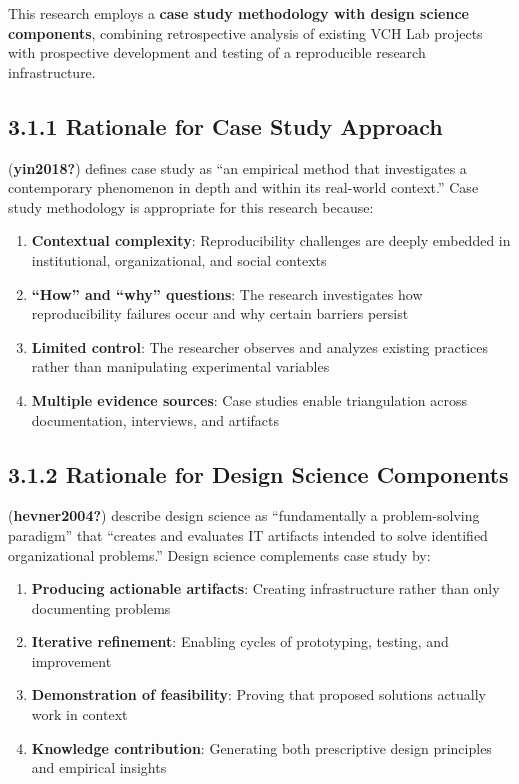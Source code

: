 \documentclass[
  oneside,
  open=any]{scrbook}
\providecommand{\tightlist}{%
  \setlength{\itemsep}{0pt}\setlength{\parskip}{0pt}}\usepackage{longtable,booktabs,array}
\begin{document}
This research employs a \textbf{case study methodology with design
science components}, combining retrospective analysis of existing VCH
Lab projects with prospective development and testing of a reproducible
research infrastructure.

\subsection{3.1.1 Rationale for Case Study
Approach}\label{rationale-for-case-study-approach}

(\textbf{yin2018?}) defines case study as ``an empirical method that
investigates a contemporary phenomenon in depth and within its
real-world context.'' Case study methodology is appropriate for this
research because:

\begin{enumerate}
\def\labelenumi{\arabic{enumi}.}
\tightlist
\item
  \textbf{Contextual complexity}: Reproducibility challenges are deeply
  embedded in institutional, organizational, and social contexts
\item
  \textbf{``How'' and ``why'' questions}: The research investigates how
  reproducibility failures occur and why certain barriers persist
\item
  \textbf{Limited control}: The researcher observes and analyzes
  existing practices rather than manipulating experimental variables
\item
  \textbf{Multiple evidence sources}: Case studies enable triangulation
  across documentation, interviews, and artifacts
\end{enumerate}

\subsection{3.1.2 Rationale for Design Science
Components}\label{rationale-for-design-science-components}

(\textbf{hevner2004?}) describe design science as ``fundamentally a
problem-solving paradigm'' that ``creates and evaluates IT artifacts
intended to solve identified organizational problems.'' Design science
complements case study by:

\begin{enumerate}
\def\labelenumi{\arabic{enumi}.}
\tightlist
\item
  \textbf{Producing actionable artifacts}: Creating infrastructure
  rather than only documenting problems
\item
  \textbf{Iterative refinement}: Enabling cycles of prototyping,
  testing, and improvement
\item
  \textbf{Demonstration of feasibility}: Proving that proposed solutions
  actually work in context
\item
  \textbf{Knowledge contribution}: Generating both prescriptive design
  principles and empirical insights
\end{enumerate}
\end{document}
